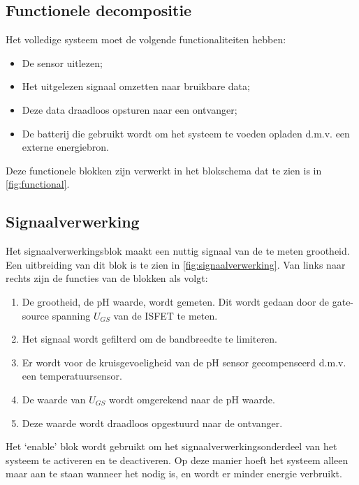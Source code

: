 \subsection{Functionele decompositie}
Het volledige systeem moet de volgende functionaliteiten hebben:

\begin{itemize}
    \item De sensor uitlezen;
    \item Het uitgelezen signaal omzetten naar bruikbare data;
    \item Deze data draadloos opsturen naar een ontvanger;
    \item De batterij die gebruikt wordt om het systeem te voeden opladen d.m.v. een externe energiebron.
\end{itemize}
Deze functionele blokken zijn verwerkt in het blokschema dat te zien is in \autoref{fig:functional}.


\subsection{Signaalverwerking}
Het signaalverwerkingsblok maakt een nuttig signaal van de te meten grootheid. Een uitbreiding van dit blok is te zien in \autoref{fig:signaalverwerking}.
Van links naar rechts zijn de functies van de blokken als volgt:
\begin{enumerate}
    \item De grootheid, de pH waarde, wordt gemeten. Dit wordt gedaan door de gate-source spanning $U_{GS}$ van de ISFET te meten.
    \item Het signaal wordt gefilterd om de bandbreedte te limiteren.
    \item Er wordt voor de kruisgevoeligheid van de pH sensor gecompenseerd d.m.v. een temperatuursensor.
    \item De waarde van $U_{GS}$ wordt omgerekend naar de pH waarde.
    \item Deze waarde wordt draadloos opgestuurd naar de ontvanger.
\end{enumerate}
Het `enable' blok wordt gebruikt om het signaalverwerkingsonderdeel van het systeem te activeren en te deactiveren. Op deze manier hoeft het systeem alleen maar aan te staan wanneer het nodig is, en wordt er minder energie verbruikt.

